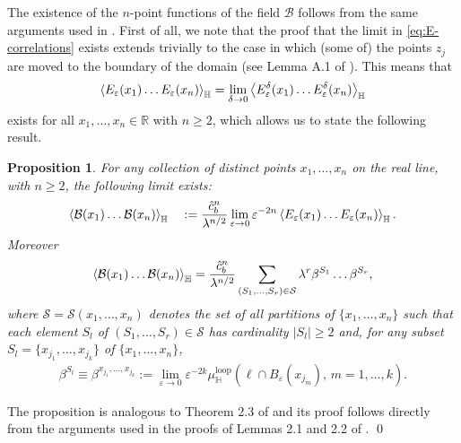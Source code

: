 \documentclass[a4paper,11pt]{article}
\newtheorem{proposition}{Proposition}[section]
\begin{document}
The existence of the $n$-point functions of the field ${\mathcal B}$ follows from the same arguments used in \cite{camia2021scalar}. First of all, we note that the proof that the limit in \eqref{eq:E-correlations} exists  extends trivially to the case in which (some of) the points $z_j$ are moved to the boundary of the domain (see Lemma A.1 of \cite{camia2021scalar}). This means that
\begin{align}
    \Braket{ E_{\varepsilon}(x_1) \ldots E_{\varepsilon}(x_n) }_{\mathbb{H}} = \lim_{\delta \to 0}\Braket{ E^{\delta}_{\varepsilon}(x_1) \ldots E^{\delta}_{\varepsilon}(x_n) }_{\mathbb{H}}
\end{align}
exists for all $x_1,\ldots,x_n \in \mathbb{R}$ with $n \geq 2$, which allows us to state the following result.
\begin{proposition} \label{prop:n-point-functions}
For any collection of distinct points $x_1, \ldots, x_n$ on the real line, with $n \geq 2$, the following limit exists:
\begin{align} \label{eq:lim-existence}
\begin{split}
\Braket{\mathcal{B}(x_1) \ldots \mathcal{B}(x_n)}_{\mathbb{H}}
\quad := \frac{\hat{c}_b^n}{\lambda^{n/2}} \lim_{\varepsilon \to 0} \varepsilon^{-2n} \Braket{ E_{\varepsilon}(x_1) \ldots E_{\varepsilon}(x_n) }_{\mathbb{H}}.
\end{split}
\end{align}
Moreover
\begin{equation}
    \Braket{\mathcal{B}(x_1) \ldots \mathcal{B}(x_n)}_{\mathbb{H}} = \frac{\hat{c}_b^n}{\lambda^{n/2}} \sum_{(S_1,\ldots,S_r) \in \mathcal{S}} \lambda^r \beta^{S_1}\ldots\beta^{S_r},
\end{equation}
where $\mathcal{S} = \mathcal{S}(x_1,\ldots,x_n)$ denotes the set of all partitions of $\{x_1,\ldots,x_n\}$ such that each element $S_l$ of $(S_1,\ldots,S_r) \in \mathcal{S}$ has cardinality $|S_l| \geq 2$ and, for any subset $S_l=\{x_{j_1},\ldots,x_{j_k}\}$ of $\{x_1,\ldots,x_n\}$, 
\begin{align}
    \beta^{S_l} \equiv \beta^{x_{j_1},\ldots,x_{j_k}} := \lim_{\varepsilon \to 0} \varepsilon^{-2k} \mu^{\text{loop}}_{\mathbb{H}}\left(\ell \cap B_{\varepsilon}(x_{j_m}), \, m=1,\ldots,k \right).
\end{align}
\end{proposition}

 The proposition is analogous to Theorem 2.3 of \cite{camia2021scalar} and its proof follows directly from the arguments used in the proofs of Lemmas 2.1 and 2.2 of \cite{camia2021scalar}. \qed
\end{document}
